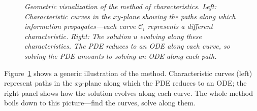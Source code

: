 \begin{figure}[htbp]
\begin{minipage}{0.48\textwidth}
\end{minipage}

\caption{\textit{Geometric visualization of the method of characteristics. Left: Characteristic curves in the \(xy\)-plane showing the paths along which information propagates---each curve \(\mathcal{C}_i\) represents a different characteristic. Right: The solution \(u\) evolving along these characteristics. The PDE reduces to an ODE along each curve, so solving the PDE amounts to solving an ODE along each path.}}
\label{fig:characteristics}
\end{figure}

\noindent Figure~\ref{fig:characteristics} shows a generic illustration of the method. Characteristic curves (left) represent paths in the \( xy \)-plane along which the PDE reduces to an ODE; the right panel shows how the solution evolves along each curve. The whole method boils down to this picture---find the curves, solve along them.

